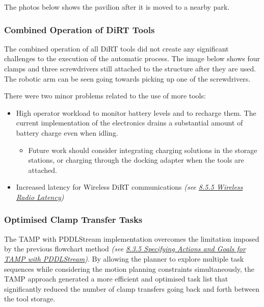 The photos below shows the pavilion after it is moved to a nearby park.




\subsubsection{Combined Operation of DiRT Tools}
\label{subsubsection:exploration_5_combined_operation_of_dirt_tools}

The combined operation of all DiRT tools did not create any significant challenges to the execution of the automatic process. The image below shows four clamps and three screwdrivers still attached to the structure after they are used. The robotic arm can be seen going towards picking up one of the screwdrivers.




There were two minor problems related to the use of more tools:

\begin{itemize}
	\item High operator workload to monitor battery levels and to recharge them. The current implementation of the electronics drains a substantial amount of battery charge even when idling.

\begin{itemize}
	\item Future work should consider integrating charging solutions in the storage stations, or charging through the docking adapter when the tools are attached.

\end{itemize}
	\item Increased latency for Wireless DiRT communications\textit{ (see \ul{8.5.5 Wireless Radio Latency})}

\end{itemize}

\subsubsection{Optimised Clamp Transfer Tasks}
\label{subsubsection:exploration_5_optimised_clamp_transfer_tasks}

The TAMP with PDDLStream implementation overcomes the limitation imposed by the previous flowchart method \textit{(see \ul{8.3.5 Specifying Actions and Goals for TAMP with PDDLStream})}. By allowing the planner to explore multiple task sequences while considering the motion planning constraints simultaneously, the TAMP approach generated a more efficient and optimised task list that significantly reduced the number of clamp transfers going back and forth between the tool storage. 

